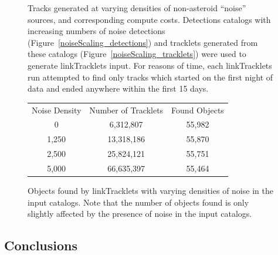 \begin{figure}[ht!]

\caption[Track generation for runs with noise.]{Tracks generated at varying densities of non-asteroid
  ``noise'' sources, and corresponding compute costs.  Detections
  catalogs with increasing numbers of noise detections
  (Figure~\ref{noiseScaling_detections}) and tracklets generated from
  these catalogs (Figure~\ref{noiseScaling_tracklets}) were used to generate
  linkTracklets input. For reasons of time, each linkTracklets run
  attempted to find only tracks which started on the first night of
  data and ended anywhere within the first 15 days.}
\label{noiseScaling_tracks}
\end{figure}


\begin{figure}[ht!]
\centering
\begin{tabular}{|c c c|}
\hline

Noise Density & Number of Tracklets & Found Objects \\
0 & 6,312,807 & 55,982 \\
1,250 & 13,318,186 & 55,870  \\
2,500 & 25,824,121 &  55,751  \\
5,000 & 66,635,397 &  55,464  \\
\hline
\end{tabular}

\caption[Test run results for runs with noise.]{Objects found by linkTracklets with varying densities of
  noise in the input catalogs.  Note that the number of objects found
  is only slightly affected by the presence of noise in the input
  catalogs.}
\label{noiseScaling_found}
\end{figure}



\subsection{Conclusions}

